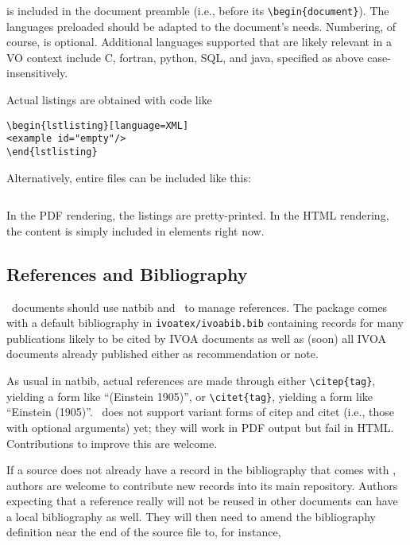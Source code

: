 \documentclass[11pt,a4paper]{ivoa}
\begin{document}
is included in the document preamble (i.e., before its
\verb|\begin{document}|). The languages preloaded should be adapted to
the document's needs. Numbering, of course, is optional.  Additional
languages supported that are likely relevant in a VO context include C,
fortran, python, SQL, and java, specified as above case-insensitively.

Actual listings are obtained with code like

\begin{verbatim}
\begin{lstlisting}[language=XML]
<example id="empty"/>
\end{lstlisting}
\end{verbatim}

Alternatively, entire files can be included like this:

\begin{verbatim}

\end{verbatim}

In the PDF rendering, the listings are pretty-printed.  In the HTML
rendering, the content is simply included in  elements right
now.

\subsection{References and Bibliography}

\ivoatex\ documents should use natbib and \BibTeX\ to manage references.
The package comes with a default bibliography in
\texttt{ivoatex/ivoabib.bib} containing records for many publications
likely to be cited by IVOA documents as well as (soon) all IVOA
documents already published either as recommendation or note. 

As usual in natbib, actual references are made through either
\verb|\citep{tag}|, yielding a form like ``(Einstein 1905)'',
or \verb|\citet{tag}|, yielding a form like ``Einstein (1905)''.
\ivoatex\ does not support variant forms of citep and citet (i.e., those
with optional arguments) yet; they will work in PDF output but fail in
HTML.  Contributions to improve this are welcome.


If a source does not already have a record in the bibliography that
comes with \ivoatex, authors are welcome to contribute new records into
its main repository.  Authors expecting that a reference really will not
be reused in other documents can have a local bibliography as well.
They will then need to amend the bibliography definition near the end of
the source file to, for instance,
\end{document}
